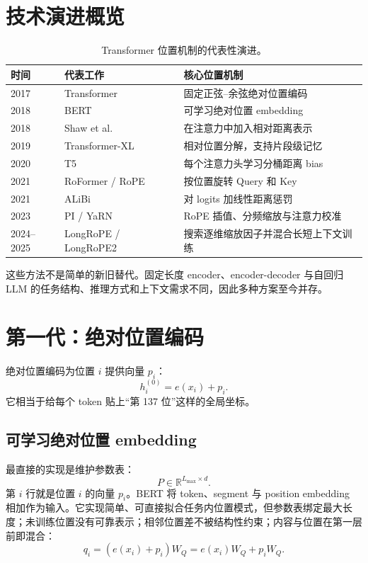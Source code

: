 \documentclass[UTF8,fontset=none,a4paper,10pt]{ctexart}
\newcommand{\R}{\mathbb{R}}
\begin{document}
\section{技术演进概览}

\begin{table}[htbp]
\centering
\small
\begin{tabularx}{\linewidth}{@{}p{1.2cm}p{3.5cm}X@{}}
\toprule
时间 & 代表工作 & 核心位置机制 \\
\midrule
2017 & Transformer & 固定正弦--余弦绝对位置编码 \\
2018 & BERT & 可学习绝对位置 embedding \\
2018 & Shaw et al. & 在注意力中加入相对距离表示 \\
2019 & Transformer-XL & 相对位置分解，支持片段级记忆 \\
2020 & T5 & 每个注意力头学习分桶距离 bias \\
2021 & RoFormer / RoPE & 按位置旋转 Query 和 Key \\
2021 & ALiBi & 对 logits 加线性距离惩罚 \\
2023 & PI / YaRN & RoPE 插值、分频缩放与注意力校准 \\
2024--2025 & LongRoPE / LongRoPE2 & 搜索逐维缩放因子并混合长短上下文训练 \\
\bottomrule
\end{tabularx}
\caption{Transformer 位置机制的代表性演进。}
\label{zh:tab:timeline}
\end{table}

这些方法不是简单的新旧替代。固定长度 encoder、encoder-decoder 与自回归 LLM 的任务结构、推理方式和上下文需求不同，因此多种方案至今并存。

\section{第一代：绝对位置编码}

绝对位置编码为位置 $i$ 提供向量 $p_i$：
\begin{equation}
  h_i^{(0)}=e(x_i)+p_i.
  \label{zh:eq:absolute}
\end{equation}
它相当于给每个 token 贴上“第 137 位”这样的全局坐标。

\subsection{可学习绝对位置 embedding}

最直接的实现是维护参数表：
\begin{equation}
  P\in\R^{L_{\max}\times d}.
  \label{zh:eq:learned-table}
\end{equation}
第 $i$ 行就是位置 $i$ 的向量 $p_i$。BERT 将 token、segment 与 position embedding 相加作为输入\cite{zh:devlin2019}。它实现简单、可直接拟合任务内位置模式，但参数表绑定最大长度；未训练位置没有可靠表示；相邻位置差不被结构性约束；内容与位置在第一层前即混合：
\begin{equation}
  q_i=(e(x_i)+p_i)W_Q=e(x_i)W_Q+p_iW_Q.
  \label{zh:eq:absolute-proj}
\end{equation}
\end{document}

